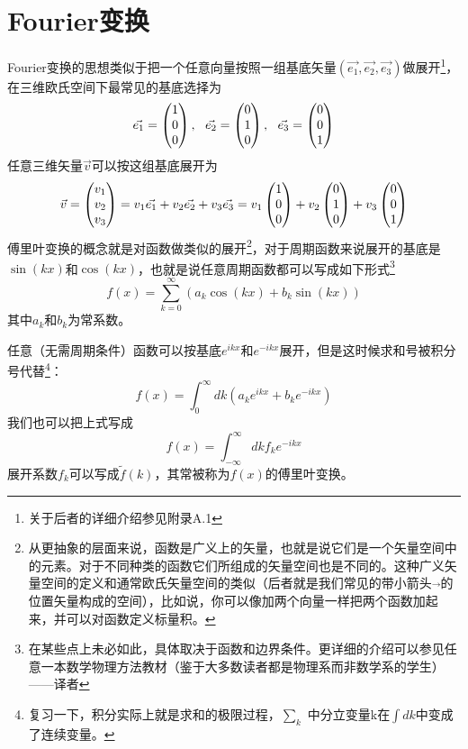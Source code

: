 \section{Fourier变换}
Fourier变换的思想类似于把一个任意向量按照一组基底矢量$(\vec{e_1},\vec{e_2},\vec{e_3})$做展开\footnote{关于后者的详细介绍参见附录A.1}，在三维欧氏空间下最常见的基底选择为
\begin{equation}
\vec{e_1}=\begin{pmatrix} 1\\0\\0 \end{pmatrix},~~
\vec{e_2}=\begin{pmatrix} 0\\1\\0 \end{pmatrix},~~
\vec{e_3}=\begin{pmatrix} 0\\0\\1 \end{pmatrix}
\end{equation}
任意三维矢量$\vec{v}$可以按这组基底展开为
\begin{equation}
\vec{v}=\begin{pmatrix} v_1\\v_2\\v_3 \end{pmatrix} =v_1\vec{e_1}+v_2\vec{e_2}+v_3\vec{e_3}=v_1\begin{pmatrix} 1\\0\\0 \end{pmatrix}+v_2\begin{pmatrix} 0\\1\\0 \end{pmatrix} +v_3\begin{pmatrix} 0\\0\\1 \end{pmatrix}
\end{equation}
傅里叶变换的概念就是对函数做类似的展开\footnote{从更抽象的层面来说，函数是广义上的矢量，也就是说它们是一个矢量空间中的元素。对于不同种类的函数它们所组成的矢量空间也是不同的。这种广义矢量空间的定义和通常欧氏矢量空间的类似（后者就是我们常见的带小箭头$\vec{~}$的位置矢量构成的空间），比如说，你可以像加两个向量一样把两个函数加起来，并可以对函数定义标量积。}，对于周期函数来说展开的基底是$\sin(kx)$和$\cos(kx)$，也就是说任意周期函数都可以写成如下形式\footnote{在某些点上未必如此，具体取决于函数和边界条件。更详细的介绍可以参见任意一本数学物理方法教材（鉴于大多数读者都是物理系而非数学系的学生）——译者}
\begin{equation}
  f(x)=\sum^{\infty}_{k=0}(a_k\cos(kx)+b_k\sin(kx))
\end{equation}
其中$a_k$和$b_k$为常系数。\par
任意（无需周期条件）函数可以按基底$e^{ikx}$和$e^{-ikx}$展开，但是这时候求和号被积分号代替\footnote{复习一下，积分实际上就是求和的极限过程，$\sum_k$ 中分立变量k在$\int dk$中变成了连续变量。}：
\begin{equation}
  f(x)=\int^\infty_0 dk(a_k e^{ikx}+b_k e^{-ikx})
\end{equation}
我们也可以把上式写成
\begin{equation}
  f(x)=\int^\infty_{-\infty} dk f_k e^{-ikx}
\end{equation}
展开系数$f_k$可以写成$\tilde f(k)$，其常被称为$f(x)$的傅里叶变换。
